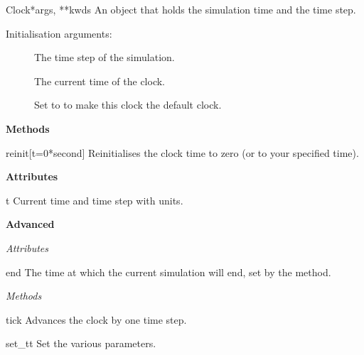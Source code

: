 \documentclass[letterpaper,10pt,english]{manual}
\begin{document}
\hypertarget{brian.Clock}{}\begin{classdesc}{Clock}{*args, **kwds}
An object that holds the simulation time and the time step.

Initialisation arguments:
\begin{description}
\item[] \leavevmode
The time step of the simulation.

\item[] \leavevmode
The current time of the clock.

\item[] \leavevmode
Set to  to make this clock the default clock.

\end{description}

\textbf{Methods}

\hypertarget{brian.Clock.reinit}{}\begin{methoddesc}{reinit}{{[}t=0*second{]}}
Reinitialises the clock time to zero (or to your
specified time).
\end{methoddesc}

\textbf{Attributes}

\hypertarget{brian.Clock.t}{}\begin{memberdesc}{t}
\hypertarget{brian.Clock.dt}{}
Current time and time step with units.
\end{memberdesc}

\textbf{Advanced}

\emph{Attributes}

\hypertarget{brian.Clock.end}{}\begin{memberdesc}{end}
The time at which the current simulation will end,
set by the  method.
\end{memberdesc}

\emph{Methods}

\hypertarget{brian.Clock.tick}{}\begin{methoddesc}{tick}{}
Advances the clock by one time step.
\end{methoddesc}

\hypertarget{brian.Clock.set_t}{}\begin{methoddesc}{set\_t}{t}
\hypertarget{brian.Clock.set_dt}{}
\hypertarget{brian.Clock.set_end}{}
Set the various parameters.
\end{methoddesc}


\end{classdesc}
\end{document}
